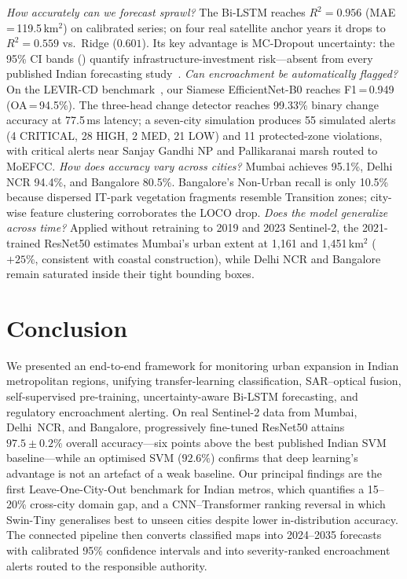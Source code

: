 \documentclass[conference]{IEEEtran}
\begin{document}
\emph{How accurately can we forecast sprawl?} The Bi-LSTM reaches $R^2=0.956$ (MAE\,=\,119.5\,km$^2$) on calibrated series; on four real satellite anchor years it drops to $R^2=0.559$ vs.\ Ridge ($0.601$). Its key advantage is MC-Dropout uncertainty: the 95\% CI bands () quantify infrastructure-investment risk---absent from every published Indian forecasting study~\cite{camarkov2025,lucknow2025,caann2025}.
\emph{Can encroachment be automatically flagged?} On the LEVIR-CD benchmark~\cite{chen2020levir}, our Siamese EfficientNet-B0 reaches F1\,=\,0.949 (OA\,=\,94.5\%). The three-head change detector reaches 99.33\% binary change accuracy at 77.5\,ms latency; a seven-city simulation produces 55 simulated alerts (4 CRITICAL, 28 HIGH, 2 MED, 21 LOW) and 11 protected-zone violations, with critical alerts near Sanjay Gandhi NP and Pallikaranai marsh routed to MoEFCC.
\emph{How does accuracy vary across cities?} Mumbai achieves 95.1\%, Delhi NCR 94.4\%, and Bangalore 80.5\%. Bangalore's Non-Urban recall is only 10.5\% because dispersed IT-park vegetation fragments resemble Transition zones; city-wise feature clustering corroborates the LOCO drop.
\emph{Does the model generalize across time?} Applied without retraining to 2019 and 2023 Sentinel-2, the 2021-trained ResNet50 estimates Mumbai's urban extent at 1{,}161 and 1{,}451\,km$^2$ ($+25\%$, consistent with coastal construction), while Delhi NCR and Bangalore remain saturated inside their tight bounding boxes.

\section{Conclusion}

We presented an end-to-end framework for monitoring urban expansion in Indian metropolitan regions, unifying transfer-learning classification, SAR--optical fusion, self-supervised pre-training, uncertainty-aware Bi-LSTM forecasting, and regulatory encroachment alerting. On real Sentinel-2 data from Mumbai, Delhi~NCR, and Bangalore, progressively fine-tuned ResNet50 attains $97.5 \pm 0.2\%$ overall accuracy---six points above the best published Indian SVM baseline---while an optimised SVM ($92.6\%$) confirms that deep learning's advantage is not an artefact of a weak baseline. Our principal findings are the first Leave-One-City-Out benchmark for Indian metros, which quantifies a 15--20\% cross-city domain gap, and a CNN--Transformer ranking reversal in which Swin-Tiny generalises best to unseen cities despite lower in-distribution accuracy. The connected pipeline then converts classified maps into 2024--2035 forecasts with calibrated 95\% confidence intervals and into severity-ranked encroachment alerts routed to the responsible authority.
\end{document}
